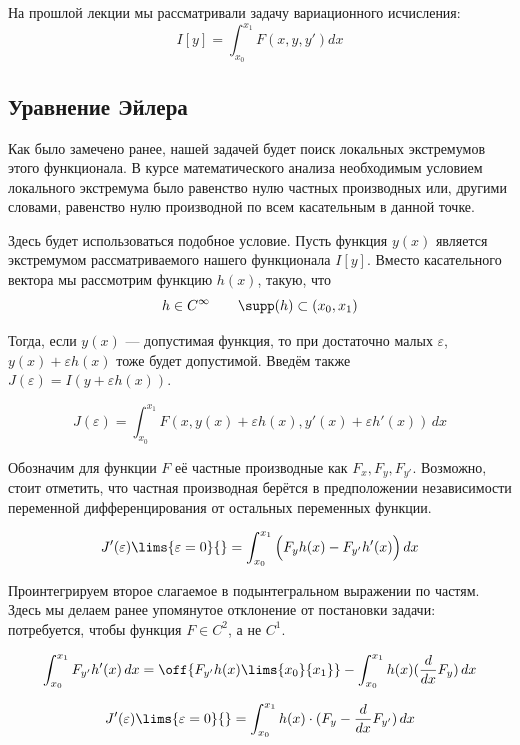 	На прошлой лекции мы рассматривали задачу вариационного исчисления:
	$$I[y] = \int_{x_0}^{x_1} F(x, y, y') dx$$
	
	
	\subsection{Уравнение Эйлера}
	
	Как было замечено ранее, нашей задачей будет поиск локальных экстремумов этого функционала. В 
	курсе математического анализа необходимым условием локального экстремума было равенство нулю
	частных производных или, другими словами, равенство нулю производной по всем касательным в данной
	точке.
	
	Здесь будет использоваться подобное условие. Пусть функция $y(x)$ является экстремумом 
	рассматриваемого нашего функционала $I[y]$. Вместо касательного вектора мы рассмотрим
	функцию $h(x)$, такую, что
	$$h \in C^{\infty} \qquad \supp(h) \subset (x_0, x_1)$$
	
	Тогда, если $y(x)$ --- допустимая функция, то при достаточно малых $\varepsilon$, $y(x) + \varepsilon h(x)$ тоже
	будет допустимой. Введём также $J(\varepsilon) = I(y + \varepsilon h(x))$.
	
	$$J(\varepsilon) = \int_{x_0}^{x_1} F(x, y(x) + \varepsilon h(x), y'(x) + \varepsilon h'(x))\,dx$$

	Обозначим для функции $F$ её частные производные как $F_x, F_y, F_{y'}$. Возможно, стоит отметить, что частная производная
	берётся в предположении независимости переменной дифференцирования от остальных переменных функции.
	
	$$J'(\varepsilon)\lims{\varepsilon = 0}{} = \int_{x_0}^{x_1} \Big( F_{y}h(x) - F_{y'}h'(x) \Big)\,dx$$
	
	Проинтегрируем второе слагаемое в подынтегральном выражении по частям. Здесь мы делаем ранее упомянутое отклонение
	от постановки задачи: потребуется, чтобы функция $F \in C^2$, а не $C^1$.
	
	$$\int_{x_0}^{x_1} F_{y'}h'(x) \,dx = \off{F_{y'}h(x) \lims{x_0}{x_1}} - \int_{x_0}^{x_1} h(x)(\frac{d}{dx} F_y)\,dx$$
	
	$$J'(\varepsilon)\lims{\varepsilon = 0}{} = \int_{x_0}^{x_1}h(x)\cdot(F_y - \frac{d}{dx}F_{y'}) \,dx$$
	

